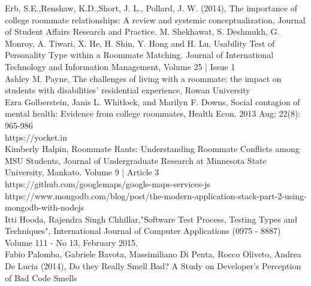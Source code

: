 \documentclass{sig-alternate-05-2015}
\begin{document}
\begin{thebibliography}{9}
Erb, S.E.,Renshaw, K.D.,Short, J. L., Pollard, J. W. (2014),
The importance of college roommate relationships: A review and systemic conceptualization, Journal of Student Affairs Research and Practice.
M. Shekhawat, S. Deshmukh, G. Monroy, A. Tiwari, X. He, H. Shin, Y. Hong and H. Lu, Usability Test of Personality Type within a Roommate Matching. Journal of International Technology and Information
Management, Volume 25 | Issue 1\\
Ashley M. Payne, The challenges of living with a roommate: the
impact on students with disabilities' residential
experience, Rowan University\\
Ezra Golberstein, Janis L. Whitlock, and Marilyn F. Downs, Social contagion of mental health: Evidence from college roommates, Health Econ. 2013 Aug; 22(8): 965-986\\
https://yocket.in\\
Kimberly Halpin, Roommate Rants: Understanding Roommate
Conflicts among MSU Students, Journal of Undergraduate Research
at Minnesota State University, Mankato. Volume 9 | Article 3\\
https://github.com/googlemaps/google-maps-services-js\\
https://www.mongodb.com/blog/post/the-modern-application-stack-part-2-using-mongodb-with-nodejs\\
Itti Hooda, Rajendra Singh Chhillar,"Software Test Process, Testing Types and Techniques", International Journal of Computer Applications (0975 - 8887) Volume 111 - No 13, February 2015.\\
Fabio Palomba, Gabriele Bavota, Massimiliano Di Penta, Rocco Oliveto, Andrea De Lucia (2014),
Do they Really Smell Bad? A Study on Developer's
Perception of Bad Code Smells\\
\end{thebibliography}
\end{document}
